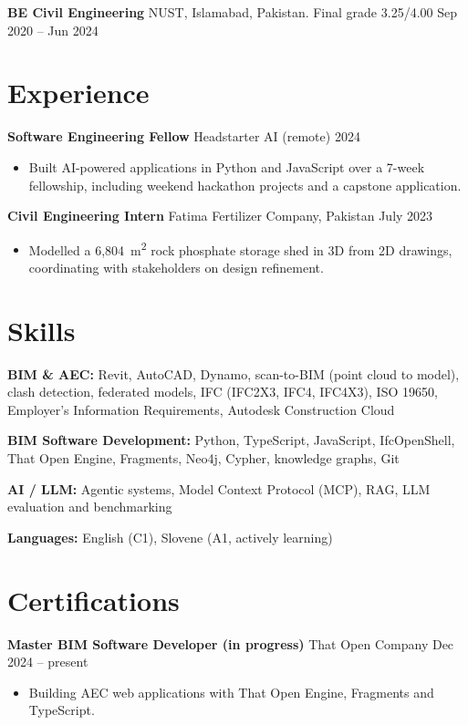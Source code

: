 \documentclass[a4paper,10.5pt]{article}
\newcommand{\datefill}{\dotfill}
\newcommand{\entry}[3]{\vspace{2.5pt}\noindent\textbf{#1} \textbar{} #2 \datefill{} #3\par\vspace{0.5pt}}
\newcommand{\skillrow}[2]{\noindent\textbf{#1:} #2\par\vspace{1pt}}
\begin{document}
\entry{BE Civil Engineering}{NUST, Islamabad, Pakistan. Final grade 3.25/4.00}{Sep 2020 -- Jun 2024}

\section{Experience}
\entry{Software Engineering Fellow}{Headstarter AI (remote)}{2024}
\begin{itemize}
  \item Built AI-powered applications in Python and JavaScript over a 7-week fellowship,
        including weekend hackathon projects and a capstone application.
\end{itemize}

\entry{Civil Engineering Intern}{Fatima Fertilizer Company, Pakistan}{July 2023}
\begin{itemize}
  \item Modelled a 6,804~m\textsuperscript{2} rock phosphate storage shed in 3D from
        2D drawings, coordinating with stakeholders on design refinement.
\end{itemize}


\section{Skills}

\skillrow{BIM \& AEC}{Revit, AutoCAD, Dynamo, scan-to-BIM (point cloud to model), clash detection, federated models, IFC (IFC2X3, IFC4, IFC4X3), ISO 19650, Employer's Information Requirements, Autodesk Construction Cloud}
\skillrow{BIM Software Development}{Python, TypeScript, JavaScript, IfcOpenShell, That Open Engine, Fragments, Neo4j, Cypher, knowledge graphs, Git}
\skillrow{AI / LLM}{Agentic systems, Model Context Protocol (MCP), RAG, LLM evaluation and benchmarking}

\skillrow{Languages}{English (C1), Slovene (A1, actively learning)}

\section{Certifications}
\entry{Master BIM Software Developer (in progress)}{That Open Company}{Dec 2024 -- present}
\begin{itemize}
  \item Building AEC web applications with That Open Engine, Fragments and TypeScript.
\end{itemize}
\end{document}
